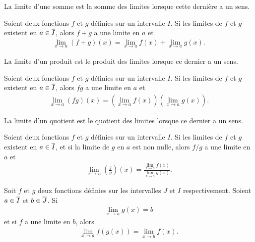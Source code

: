 \documentclass[main.tex]{subfiles}
\begin{document}
La limite d'une somme est la somme des limites
lorsque cette dernière a un sens.

\begin{proposition}

    Soient deux fonctions $f$ et $g$ définies sur un intervalle $I$.
    Si les limites de $f$ et $g$ existent en $a \in \overline{I}$,
    alors $f + g$ a une limite en $a$ et
    \begin{align}
        \lim_{x \to a} (f + g)(x) = \lim_{x \to a} f(x) + \lim_{x \to a} g(x).
    \end{align}
\end{proposition}

La limite d'un produit est le produit des limites
lorsque ce dernier a un sens.

\begin{proposition}

    Soient deux fonctions $f$ et $g$ définies sur un intervalle $I$.
    Si les limites de $f$ et $g$ existent en $a \in \overline{I}$,
    alors $f g$ a une limite en $a$ et
    \begin{align}
        \lim_{x \to a} (fg)(x) = \left(\lim_{x \to a} f(x)\right) \left(\lim_{x \to a} g(x)\right).
    \end{align}
\end{proposition}

La limite d'un quotient est le quotient des limites
lorsque ce dernier a un sens.

\begin{proposition}

    Soient deux fonctions $f$ et $g$ définies sur un intervalle $I$.
    Si les limites de $f$ et $g$ existent en $a \in \overline{I}$,
    et si la limite de $g$ en $a$ est non nulle,
    alors $f / g$ a une limite en $a$ et
    \begin{align}
        \lim_{x \to a} \left(\frac f g\right)(x) = \frac {\lim_{x \to a} f(x)} {\lim_{x \to a} g(x)}.
    \end{align}
\end{proposition}

\begin{proposition}

    Soit $f$ et $g$ deux fonctions définies sur les intervalles $J$ et $I$ respectivement.
    Soient $a \in \overline{I}$ et $b \in \overline{J}$.
    Si
    \begin{align}
        \lim_{x \to a} g(x) = b
    \end{align}
    et si $f$ a une limite en $b$,
    alors
    \begin{align}
        \lim_{x \to a} f(g(x)) = \lim_{x \to b} f(x).
    \end{align}
\end{proposition}
\end{document}
